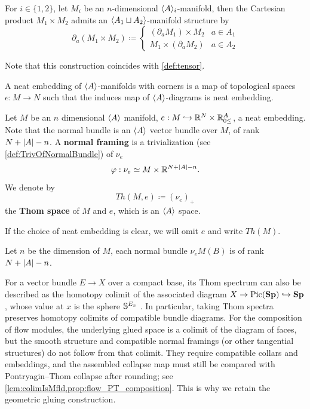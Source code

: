 \begin{constr}\label{const:prod}
    For $i\in\{1,2\}$, let $M_i$ be an $n$-dimensional $\langle A \rangle_i$-manifold, then the Cartesian product $M_1\times M_2$ admits an $\langle A_1 \sqcup A_2 \rangle$-manifold structure by
    \begin{equation*}
        \partial_a (M_1 \times M_2) \coloneqq \begin{cases}
            (\partial_a M_1) \times M_2 & a \in A_1\\
            M_1 \times (\partial_a M_2) & a \in A_2
        \end{cases}
    \end{equation*}
\end{constr}

Note that this construction coincides with \cref{def:tensor}.

\begin{defn}
    A neat embedding of $\langle A \rangle$-manifolds with corners is a map of topological spaces $e:M \to N$ such that the induces map of $\langle A \rangle$-diagrams is neat embedding.
\end{defn}

\begin{defn}\label{def:NormalFramingOfMfld}
    Let $M$ be an $n$ dimensional $\langle A \rangle$ manifold, $e:M \hookrightarrow  \mathbb{R}^N \times \mathbb{R}_{0 \leq}^A$, a neat embedding. Note that the normal bundle is an $\langle A \rangle$ vector bundle over $M$, of rank $N+\left\lvert A\right\rvert-n$. A \textbf{normal framing} is a trivialization (see \cref{def:TrivOfNormalBundle}) of $\nu_e$
    \begin{equation*}
        \varphi: \nu_e \simeq M \times \mathbb{R}^{N+\left\lvert A\right\rvert-n}.
    \end{equation*}
    We denote by 
    \begin{equation*}
        Th(M,e) \coloneqq (\nu_e)_+
    \end{equation*}
    the \textbf{Thom space} of $M$ and $e$, which is an $\langle A \rangle$ space.
\end{defn}
If the choice of neat embedding is clear, we will omit $e$ and write $Th(M)$.
\begin{rem*}
    Let $n$ be the dimension of $M$, each normal bundle $\nu_e M(B)$ is of rank $N +\left\lvert A\right\rvert - n$.
\end{rem*}
\begin{rem}
For a vector bundle $E\to X$ over a compact base, its Thom spectrum can also be described as the homotopy colimit of the associated diagram $X\to\operatorname{Pic}(\mathbf{Sp})\hookrightarrow\mathbf{Sp}$, whose value at $x$ is the sphere $\mathbb{S}^{E_x}$ \cite[Definition~1.4 and Section~3.3]{ABGHR14Thom}. In particular, taking Thom spectra preserves homotopy colimits of compatible bundle diagrams. For the composition of flow modules, the underlying glued space is a colimit of the diagram of faces, but the smooth structure and compatible normal framings (or other tangential structures) do not follow from that colimit. They require compatible collars and embeddings, and the assembled collapse map must still be compared with Pontryagin--Thom collapse after rounding; see \cref{lem:colimIsMfld,prop:flow_PT_composition}. This is why we retain the geometric gluing construction.
\end{rem}

